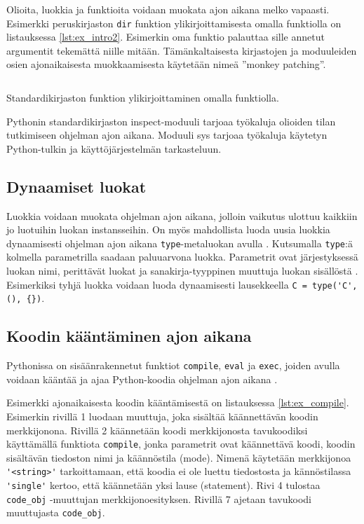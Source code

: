\documentclass[finnish]{tktltiki2}
\theoremstyle{definition}
\theoremstyle{remark}
\begin{document}
Olioita, luokkia ja funktioita voidaan muokata ajon aikana melko vapaasti. Esimerkki peruskirjaston \verb|dir| funktion ylikirjoittamisesta omalla funktiolla on listauksessa \ref{lst:ex_intro2}. Esimerkin oma funktio palauttaa sille annetut argumentit tekemättä niille mitään. Tämänkaltaisesta kirjastojen ja moduuleiden osien ajonaikaisesta muokkaamisesta käytetään nimeä ''monkey patching''.

\begin{listing}
    \inputminted[linenos]{python}{code/introspektio2.py}
    \caption{Standardikirjaston funktion ylikirjoittaminen omalla funktiolla.}
    \label{lst:ex_intro2}
\end{listing}

Pythonin standardikirjaston inspect-moduuli tarjoaa työkaluja olioiden tilan tutkimiseen ohjelman ajon aikana. Moduuli sys tarjoaa työkaluja käytetyn Python-tulkin ja käyttöjärjestelmän tarkasteluun.

\subsection{Dynaamiset luokat}

Luokkia voidaan muokata ohjelman ajon aikana, jolloin vaikutus ulottuu kaikkiin jo luotuihin luokan instansseihin. On myös mahdollista luoda uusia luokkia dynaamisesti ohjelman ajon aikana \verb|type|-metaluokan avulla \cite{MetaprogP3}. Kutsumalla \verb|type|:ä kolmella parametrilla saadaan paluuarvona luokka. Parametrit ovat järjestyksessä luokan nimi, perittävät luokat ja sanakirja-tyyppinen muuttuja luokan sisällöstä \cite{MetaprogP3}. Esimerkiksi tyhjä luokka voidaan luoda dynaamisesti lausekkeella \verb|C = type('C', (), {})|.



\subsection{Koodin kääntäminen ajon aikana}

Pythonissa on sisäänrakennetut funktiot \verb|compile|, \verb|eval| ja \verb|exec|, joiden avulla voidaan kääntää ja ajaa Python-koodia ohjelman ajon aikana \cite{codeobjects,martelli2006python}.

Esimerkki ajonaikaisesta koodin kääntämisestä on listauksessa \ref{lst:ex_compile}. Esimerkin rivillä 1 luodaan muuttuja, joka sisältää käännettävän koodin merkkijonona. Rivillä 2 käännetään koodi merkkijonosta tavukoodiksi käyttämällä funktiota \verb|compile|, jonka parametrit ovat käännettävä koodi, koodin sisältävän tiedoston nimi ja käännöstila (mode). Nimenä käytetään merkkijonoa \verb|'<string>'| tarkoittamaan, että koodia ei ole luettu tiedostosta ja kännöstilassa \verb|'single'| kertoo, että käännetään yksi lause (statement). Rivi 4 tulostaa \verb|code_obj| -muuttujan merkkijonoesityksen. Rivillä 7 ajetaan tavukoodi muuttujasta \verb|code_obj|.
\end{document}
